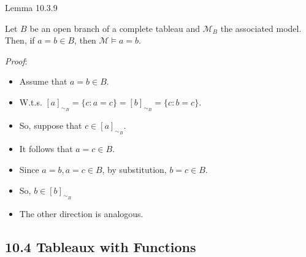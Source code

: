 \documentclass[../slides.tex]{subfiles}
\begin{document}
\begin{frame}{Lemma 10.3.9}

Let $B$ be an open branch of a complete tableau and $\mathcal{M}_B$ the associated model. Then, if $a=b\in B$, then $\mathcal{M}\vDash a=b$.

\vspace{2ex}

\emph{Proof}:

\begin{itemize}

	\item Assume that $a=b\in B$.
	
	\item W.t.s. $[a]_{\sim_B}=\{c:a=c\}=[b]_{\sim_B}=\{c:b=c\}$.
	
	\item So, suppose that $c\in [a]_{\sim_B}$. 
	
	\item It follows that $a=c\in B$. 
	
	\item Since $a=b, a=c\in B$, by substitution, $b=c\in B$.
	
	\item So, $b\in [b]_{\sim_B}$
	
	\item The other direction is analogous.

\end{itemize}

\end{frame}

\subsection{10.4 Tableaux with Functions}
\end{document}
